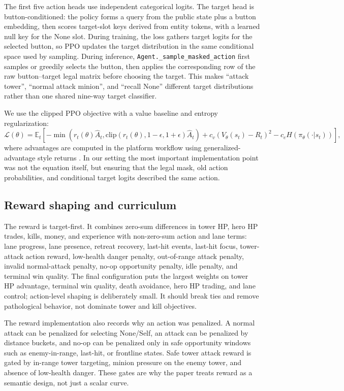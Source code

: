 \documentclass{article}
\begin{document}
The first five action heads use independent categorical logits. The target head is button-conditioned: the policy forms a query from the public state plus a button embedding, then scores target-slot keys derived from entity tokens, with a learned null key for the None slot. During training, the loss gathers target logits for the selected button, so PPO updates the target distribution in the same conditional space used by sampling. During inference, \texttt{Agent.\_sample\_masked\_action} first samples or greedily selects the button, then applies the corresponding row of the raw button--target legal matrix before choosing the target. This makes ``attack tower'', ``normal attack minion'', and ``recall None'' different target distributions rather than one shared nine-way target classifier.

We use the clipped PPO objective \citep{schulman2017ppo} with a value baseline and entropy regularization:
\[
  \mathcal{L}(\theta) =
  \mathbb{E}_t \left[
  -\min(r_t(\theta) \hat{A}_t,
       \mathrm{clip}(r_t(\theta), 1-\epsilon, 1+\epsilon)\hat{A}_t)
  + c_v (V_\theta(s_t)-R_t)^2
  - c_e H(\pi_\theta(\cdot|s_t))
  \right],
\]
where advantages are computed in the platform workflow using generalized-advantage style returns \citep{schulman2015gae}. In our setting the most important implementation point was not the equation itself, but ensuring that the legal mask, old action probabilities, and conditional target logits described the same action.

\subsection{Reward shaping and curriculum}

The reward is target-first. It combines zero-sum differences in tower HP, hero HP trades, kills, money, and experience with non-zero-sum action and lane terms: lane progress, lane presence, retreat recovery, last-hit events, last-hit focus, tower-attack action reward, low-health danger penalty, out-of-range attack penalty, invalid normal-attack penalty, no-op opportunity penalty, idle penalty, and terminal win quality. The final configuration puts the largest weights on tower HP advantage, terminal win quality, death avoidance, hero HP trading, and lane control; action-level shaping is deliberately small. It should break ties and remove pathological behavior, not dominate tower and kill objectives.

The reward implementation also records why an action was penalized. A normal attack can be penalized for selecting None/Self, an attack can be penalized by distance buckets, and no-op can be penalized only in safe opportunity windows such as enemy-in-range, last-hit, or frontline states. Safe tower attack reward is gated by in-range tower targeting, minion pressure on the enemy tower, and absence of low-health danger. These gates are why the paper treats reward as a semantic design, not just a scalar curve.
\end{document}

